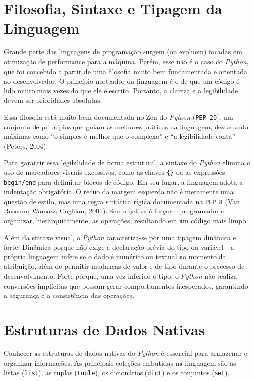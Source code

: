 \documentclass[
  brazilian,
  letterpaper,
  DIV=11,
  numbers=noendperiod]{scrreprt}
\begin{document}
\section{Filosofia, Sintaxe e Tipagem da
Linguagem}\label{filosofia-sintaxe-e-tipagem-da-linguagem}

Grande parte das linguagens de programação surgem (ou evoluem) focadas
em otimização de performance para a máquina. Porém, esse não é o caso do
\emph{Python}, que foi concebido a partir de uma filosofia muito bem
fundamentada e orientada ao desenvolvedor. O princípio norteador da
linguagem é o de que um código é lido muito mais vezes do que ele é
escrito. Portanto, a clareza e a legibilidade devem ser prioridades
absolutas.

Essa filosofia está muito bem documentada no Zen do \emph{Python}
(\texttt{PEP\ 20}), um conjunto de princípios que guiam as melhores
práticas na linguagem, destacando máximas como ``o simples é melhor que
o complexo'' e ``a legibilidade conta'' (Peters, 2004).

Para garantir essa legibilidade de forma estrutural, a sintaxe do
\emph{Python} elimina o uso de marcadores visuais excessivos, como as
chaves \texttt{\{\}} ou as expressões \texttt{begin/end} para delimitar
blocos de código. Em seu lugar, a linguagem adota a indentação
obrigatória. O recuo da margem esquerda não é meramente uma questão de
estilo, mas uma regra sintática rígida documentada na \texttt{PEP\ 8}
(Van Rossum; Warsaw; Coghlan, 2001). Seu objetivo é forçar o programador
a organizar, hierarquicamente, as operações, resultando em um código
mais limpo.

Além da sintaxe visual, o \emph{Python} caracteriza-se por uma tipagem
dinâmica e forte. Dinâmica porque não exige a declaração prévia do tipo
da variável - a própria linguagem infere se o dado é numérico ou textual
no momento da atribuição, além de permitir mudanças de valor e de tipo
durante o processo de desenvolvimento. Forte porque, uma vez inferido o
tipo, o \emph{Python} não realiza conversões implícitas que possam gerar
comportamentos inesperados, garantindo a segurança e a consistência das
operações.

\section{Estruturas de Dados Nativas}\label{estruturas-de-dados-nativas}

Conhecer as estruturas de dados nativas do \emph{Python} é essencial
para armazenar e organizar informações. As principais coleções embutidas
na linguagem são as listas (\texttt{list}), as tuplas (\texttt{tuple}),
os dicionários (\texttt{dict}) e os conjuntos (\texttt{set}).
\end{document}
